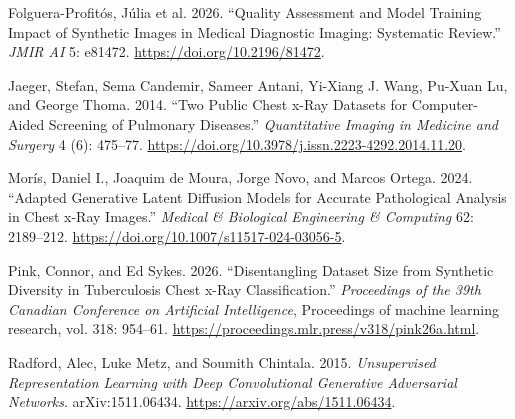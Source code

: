\documentclass[
]{article}
\newlength{\cslhangindent}
\newenvironment{CSLReferences}[2] %
 {\begin{list}{}{%
  \setlength{\itemindent}{0pt}
  \setlength{\leftmargin}{0pt}
  \setlength{\parsep}{0pt}
  \ifodd #1
   \setlength{\leftmargin}{\cslhangindent}
   \setlength{\itemindent}{-1\cslhangindent}
  \fi
  \setlength{\itemsep}{#2\baselineskip}}}
 {\end{list}}
\begin{document}
\protect{}\label{refs}
\begin{CSLReferences}{1}{1}
{Folguera-Profitós, Júlia et al.} 2026. {``Quality Assessment and Model
Training Impact of Synthetic Images in Medical Diagnostic Imaging:
Systematic Review.''} \emph{JMIR AI} 5: e81472.
\url{https://doi.org/10.2196/81472}.

Jaeger, Stefan, Sema Candemir, Sameer Antani, Yi-Xiang J. Wang, Pu-Xuan
Lu, and George Thoma. 2014. {``Two Public Chest x-Ray Datasets for
Computer-Aided Screening of Pulmonary Diseases.''} \emph{Quantitative
Imaging in Medicine and Surgery} 4 (6): 475--77.
\url{https://doi.org/10.3978/j.issn.2223-4292.2014.11.20}.

Morís, Daniel I., Joaquim de Moura, Jorge Novo, and Marcos Ortega. 2024.
{``Adapted Generative Latent Diffusion Models for Accurate Pathological
Analysis in Chest x-Ray Images.''} \emph{Medical \& Biological
Engineering \& Computing} 62: 2189--212.
\url{https://doi.org/10.1007/s11517-024-03056-5}.

Pink, Connor, and Ed Sykes. 2026. {``Disentangling Dataset Size from
Synthetic Diversity in Tuberculosis Chest x-Ray Classification.''}
\emph{Proceedings of the 39th Canadian Conference on Artificial
Intelligence}, Proceedings of machine learning research, vol. 318:
954--61. \url{https://proceedings.mlr.press/v318/pink26a.html}.

Radford, Alec, Luke Metz, and Soumith Chintala. 2015. \emph{Unsupervised
Representation Learning with Deep Convolutional Generative Adversarial
Networks}. arXiv:1511.06434. \url{https://arxiv.org/abs/1511.06434}.

\end{CSLReferences}
\end{document}
